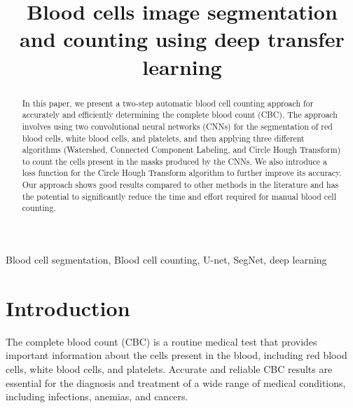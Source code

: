 \documentclass[conference]{IEEEtran}
\begin{document}
\title{Blood cells image segmentation and counting using deep transfer learning }

\author{
\and
{}
\and
{}
\and
{}\and
{}}
\maketitle
\vspace*{-0.8cm}
\begin{abstract}

In this paper, we present a two-step automatic blood cell counting approach for accurately and efficiently determining the complete blood count (CBC). The approach involves using two convolutional neural networks (CNNs) for the segmentation of red blood cells, white blood cells, and platelets, and then applying three different algorithms (Watershed, Connected Component Labeling, and Circle Hough Transform) to count the cells present in the masks produced by the CNNs. We also introduce a loss function for the Circle Hough Transform algorithm to further improve its accuracy. Our approach shows good results compared to other methods in the literature and has the potential to significantly reduce the time and effort required for manual blood cell counting.
\end{abstract}

\begin{IEEEkeywords}
Blood cell segmentation, Blood cell counting, U-net, SegNet, deep learning 
\end{IEEEkeywords}

\section{Introduction}
The complete blood count (CBC) is a routine medical test that provides important information about the cells present in the blood, including red blood cells, white blood cells, and platelets. Accurate and reliable CBC results are essential for the diagnosis and treatment of a wide range of medical conditions, including infections, anemias, and cancers.
\end{document}
